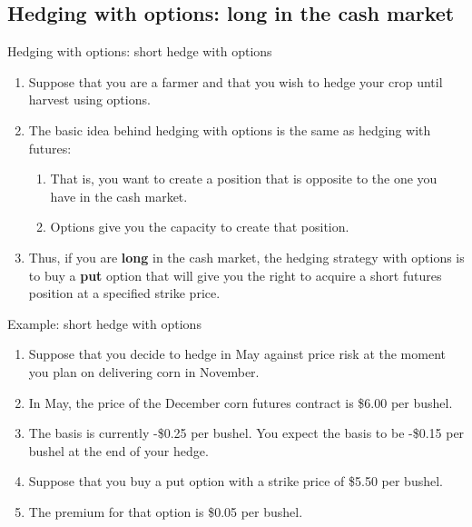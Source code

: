 \documentclass[table,xcolor=pdftex,dvipsnames, handout]{beamer}\usepackage[]{graphicx}\usepackage[]{color}
\begin{document}

\subsection{Hedging with options: long in the cash market}

\begin{frame}{Hedging with options: short hedge with options}
\begin{enumerate}[label=\textbullet]
  \item Suppose that you are a farmer and that you wish to hedge your crop until harvest using options.
  \item The basic idea behind hedging with options is the same as hedging with futures:
      \begin{enumerate}[label=-]
            \item That is, you want to create a position that is opposite to the one you have in the cash market.
            \item Options give you the capacity to create that position.
      \end{enumerate}
  \item Thus, if you are \textbf{long} in the cash market, the hedging strategy with options is to buy a \textbf{put} option that will give you the right to acquire a short futures position at a specified strike price.
\end{enumerate}
\end{frame}


\begin{frame}{Example: short hedge with options}\label{slide: short hedge}
\begin{enumerate}[label=\textbullet]
  \item Suppose that you decide to hedge in May against price risk at the moment you plan on delivering corn in November.
  \item In May, the price of the December corn futures contract is \$6.00 per bushel.
  \item The basis is currently -\$0.25 per bushel. You expect the basis to be -\$0.15 per bushel at the end of your hedge.
  \item Suppose that you buy a put option with a strike price of \$5.50 per bushel.
  \item The premium for that option is \$0.05 per bushel.
\end{enumerate}
\end{frame}
\end{document}
